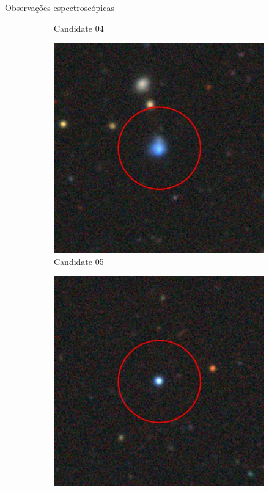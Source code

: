 \begin{frame}[c]{Observações espectroscópicas}
\begin{figure}
\begin{subfigure}[b]{0.11\textwidth}
        \caption{Candidate 04}
    \end{subfigure}
    \begin{subfigure}[b]{0.11\textwidth}
        \includegraphics[width=\textwidth]{images/proposatal_candidatas_1/UCG05.jpg}
        \caption{Candidate 05}
    \end{subfigure}
    \begin{subfigure}[b]{0.11\textwidth}
        \includegraphics[width=\textwidth]{images/proposatal_candidatas_1/UCG06.jpg}

\end{subfigure}
\end{figure}
\end{frame}
